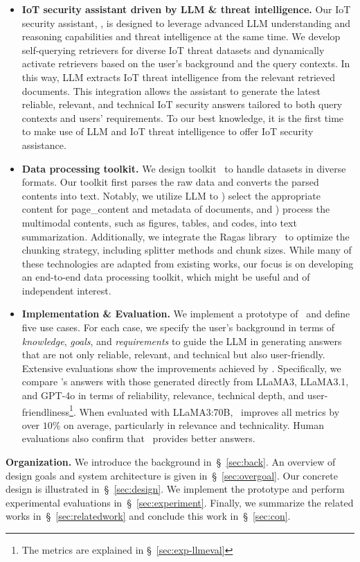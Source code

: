 \begin{itemize}
    \item \textbf{IoT security assistant driven by LLM \& threat intelligence.}
    Our IoT security assistant, \chatiot, is designed to leverage advanced LLM understanding and reasoning capabilities and threat intelligence at the same time. 
    We develop self-querying retrievers for diverse IoT threat datasets and dynamically activate retrievers based on the user's background and the query contexts. 
    In this way, LLM extracts IoT threat intelligence from the relevant retrieved documents.
    This integration allows the assistant to generate the latest reliable, relevant, and technical IoT security answers tailored to both query contexts and users' requirements.
    To our best knowledge, it is the first time to make use of LLM and IoT threat intelligence to offer IoT security assistance.
    
    
    \item \textbf{Data processing toolkit.}
    We design toolkit \datakit\ to handle datasets in diverse formats. Our toolkit first parses the raw data and converts the parsed contents into text. Notably, we utilize LLM to ) select the appropriate content for page\_content and metadata of documents, and ) process the multimodal contents, such as figures, tables, and codes, into text summarization. 
    Additionally, we integrate the Ragas library~\cite{es2023ragas} to optimize the chunking strategy, including splitter methods and chunk sizes. 
    While many of these technologies are adapted from existing works, our focus is on developing an end-to-end data processing toolkit, which might be useful and of independent interest.
    

    \item \textbf{Implementation \& Evaluation.}
    We implement a prototype of \chatiot\ and define five use cases. 
    For each case, we specify the user’s background in terms of \textit{knowledge}, \textit{goals}, and \textit{requirements} to guide the LLM in generating answers that are not only reliable, relevant, and technical but also user-friendly.
    Extensive evaluations show the improvements achieved by \chatiot. 
    Specifically, we compare \chatiot's answers with those generated directly from LLaMA3, LLaMA3.1, and GPT-4o in terms of reliability, relevance, technical depth, and user-friendliness\footnote{The metrics are explained in \S~\ref{sec:exp-llmeval}}.
    When evaluated with LLaMA3:70B, \chatiot\ improves all metrics by over $10\%$ on average, particularly in relevance and technicality. 
    Human evaluations also confirm that \chatiot\ provides better answers.
\end{itemize}

\smallskip
\noindent \textbf{Organization.}
We introduce the background in~\S~\ref{sec:back}. 
An overview of design goals and system architecture is given in~\S~\ref{sec:overgoal}.
Our concrete design is illustrated in~\S~\ref{sec:design}. 
We implement the prototype and perform experimental evaluations in~\S~\ref{sec:experiment}. 
Finally, we summarize the related works in~\S~\ref{sec:relatedwork} and conclude this work in~\S~\ref{sec:con}. 